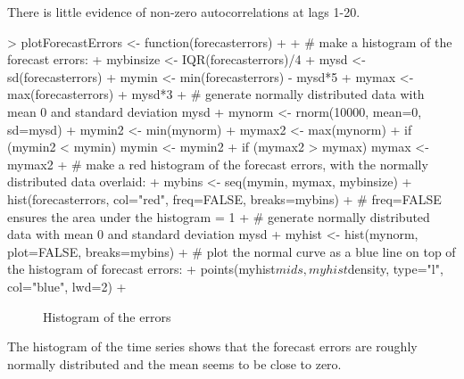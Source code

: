 \documentclass[11pt, a4paper]{article} %
\begin{document}
There is little evidence of non-zero autocorrelations at lags 1-20.
\begin{Schunk}
\begin{Sinput}
> plotForecastErrors <- function(forecasterrors)
+ {
+ # make a histogram of the forecast errors:
+ mybinsize <- IQR(forecasterrors)/4
+ mysd <- sd(forecasterrors)
+ mymin <- min(forecasterrors) - mysd*5
+ mymax <- max(forecasterrors) + mysd*3
+ # generate normally distributed data with mean 0 and standard deviation mysd
+ mynorm <- rnorm(10000, mean=0, sd=mysd)
+ mymin2 <- min(mynorm)
+ mymax2 <- max(mynorm)
+ if (mymin2 < mymin) { mymin <- mymin2 }
+ if (mymax2 > mymax) { mymax <- mymax2 }
+ # make a red histogram of the forecast errors, with the normally distributed data overlaid:
+ mybins <- seq(mymin, mymax, mybinsize)
+ hist(forecasterrors, col="red", freq=FALSE, breaks=mybins)
+ # freq=FALSE ensures the area under the histogram = 1
+ # generate normally distributed data with mean 0 and standard deviation mysd
+ myhist <- hist(mynorm, plot=FALSE, breaks=mybins)
+ # plot the normal curve as a blue line on top of the histogram of forecast errors:
+ points(myhist$mids, myhist$density, type="l", col="blue", lwd=2)
+ }
\end{Sinput}
\end{Schunk}
\begin{figure}[H]
\centering
\begin{Schunk}
\end{Schunk}
\caption{Histogram of the errors}
\end{figure}
\noindent The histogram of the time series shows that the forecast errors are roughly normally distributed and the mean seems to be close to zero.
\end{document}
